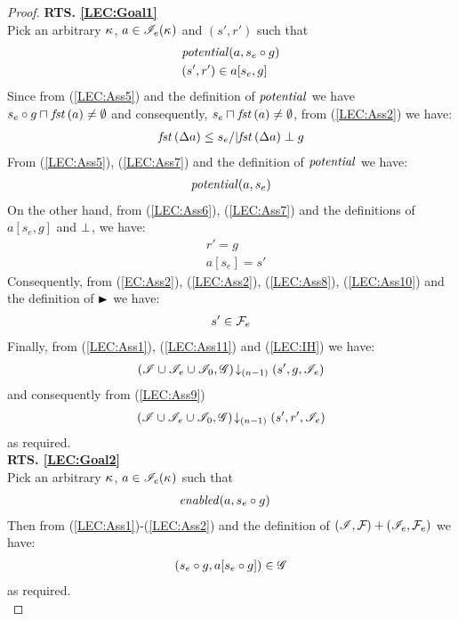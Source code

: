\begin{lemma}
\begin{proof}
\noindent\textbf{RTS. \ref{LEC:Goal1}}\\
Pick an arbitrary $\kappa_{}$, $a \in \mathscr{I}_e(\kappa_{})$ and $(s', r')$ such that
%
\begin{align}
	& \mathit{potential}(a, s_e \circ g) \label{LEC:Ass5}\\
	& (s', r') \in a[s_e, g] \label{LEC:Ass6}
\end{align}
Since from (\ref{LEC:Ass5}) and the definition of $\mathit{potential}$ we have $s_e \circ g \sqcap_{} \mathit{fst}\left(a\right) \not= \emptyset$ and consequently, $s_e \sqcap_{} \mathit{fst}\left(a\right) \not= \emptyset$, from (\ref{LEC:Ass2}) we have:
%
\begin{align}
	\mathit{fst}\left(\Delta {a}\right) \leq s_e /| \mathit{fst}\left(\Delta {a}\right) \mathrel{\bot} g\label{LEC:Ass7}
\end{align}
% 
From (\ref{LEC:Ass5}), (\ref{LEC:Ass7}) and the definition of $\mathit{potential}$ we have:
%
\begin{align}
	\mathit{potential}(a, s_e) \label{LEC:Ass8}
\end{align}
%
On the other hand, from (\ref{LEC:Ass6}), (\ref{LEC:Ass7}) and the definitions of $a[s_e, g]$ and $\mathrel{\bot}$, we have: 
%
\begin{align}
	& r' = g \label{LEC:Ass9}\\
	& a[s_e] = s' \label{LEC:Ass10}
\end{align}
%
Consequently, from (\ref{EC:Ass2}), (\ref{LEC:Ass2}), (\ref{LEC:Ass8}), (\ref{LEC:Ass10}) and the definition of $\strictfences$ we have:
%
\begin{align}
	s' \in  \mathcal{F}_{e}  \label{LEC:Ass11}
\end{align}
%
Finally, from (\ref{LEC:Ass1}), (\ref{LEC:Ass11}) and (\ref{LEC:IH}) we have:
%
\begin{align*}
	\left(\mathscr{I} \cup \mathscr{I}_{e} \cup \mathscr{I}_0, \mathscr{G}\right) \!\downarrow_{(n-1)} \left(s', g, \mathscr{I}_e\right)
\end{align*}
%
and consequently from (\ref{LEC:Ass9})
%
\begin{align*}
	\left(\mathscr{I} \cup \mathscr{I}_{e} \cup \mathscr{I}_0, \mathscr{G}\right) \!\downarrow_{(n-1)} \left(s', r', \mathscr{I}_e\right)
\end{align*}
%
as required.\\
%
%
%
%
%

\noindent\textbf{RTS. \ref{LEC:Goal2}}\\
Pick an arbitrary $\kappa_{}$, $a \in \mathscr{I}_e(\kappa_{})$ such that
%
\begin{align}
	& \mathit{enabled}(a, s_e \circ g) \label{LEC:Ass20}
\end{align}
Then from (\ref{LEC:Ass1})-(\ref{LEC:Ass2}) and the definition of $(\mathscr{I}, \mathcal{F}_{}) + (\mathscr{I}_e, \mathcal{F}_{e})$ we have:
%
\begin{align*}
	(s_e \circ g, a[s_e \circ g]) \in \mathscr{G}
\end{align*}
%
as required.\\
%
%
%


\end{proof}
\end{lemma}
